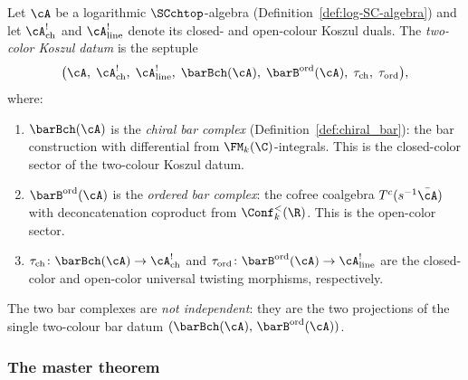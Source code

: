 \begin{definition}
\label{def:two-color-koszul-datum}
Let $\cA$ be a logarithmic $\SCchtop$-algebra
\textup{(}Definition~\textup{\ref{def:log-SC-algebra})} and
let $\cA^!_{\mathrm{ch}}$ and $\cA^!_{\mathrm{line}}$ denote
its closed- and open-colour Koszul duals. The \emph{two-color
Koszul datum} is the septuple
\[
\bigl(\cA,\; \cA^!_{\mathrm{ch}},\; \cA^!_{\mathrm{line}},\;
\barBch(\cA),\; \barB^{\mathrm{ord}}(\cA),\;
\tau_{\mathrm{ch}},\; \tau_{\mathrm{ord}}\bigr),
\]
where:
\begin{enumerate}[label=\textup{(\roman*)}]
\item $\barBch(\cA)$ is the \emph{chiral bar complex}
 (Definition~\ref{def:chiral_bar}): the bar construction with
 differential from $\FM_k(\C)$-integrals. This is the
 closed-color sector of the two-colour Koszul datum.
\item $\barB^{\mathrm{ord}}(\cA)$ is the \emph{ordered bar
 complex}: the cofree coalgebra $T^c(s^{-1}\bar{\cA})$ with
 deconcatenation coproduct from $\Conf_k^{<}(\R)$. This is
 the open-color sector.
\item $\tau_{\mathrm{ch}} \colon \barBch(\cA) \to
 \cA^!_{\mathrm{ch}}$ and
 $\tau_{\mathrm{ord}} \colon \barB^{\mathrm{ord}}(\cA) \to
 \cA^!_{\mathrm{line}}$ are the closed-color and open-color
 universal twisting morphisms, respectively.
\end{enumerate}
The two bar complexes are \emph{not independent}: they are the
two projections of the single two-colour bar datum
$(\barBch(\cA),\, \barB^{\mathrm{ord}}(\cA))$.
\end{definition}

\subsubsection*{The master theorem}

